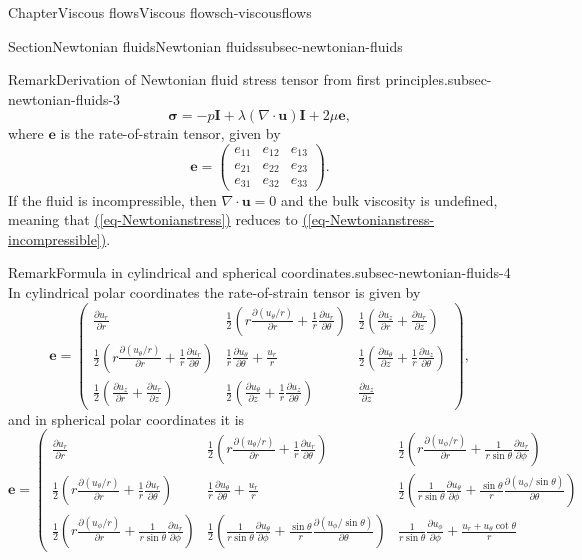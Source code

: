 \documentclass[oneside,10pt,]{book}
\newcommand{\xreffont}{\relax}
\numberwithin{equation}{section}
\newcommand{\pd}[2]{\frac{\partial#1}{\partial#2}}
\newcommand{\be}{\boldsymbol{e}}
\newcommand{\bu}{\boldsymbol{u}}
\newcommand{\bsigma}{\boldsymbol{\sigma}}
\newcommand{\bI}{\boldsymbol{I}}
\begin{document}
\begin{chapterptx}{Chapter}{Viscous flows}{}{Viscous flows}{}{}{ch-viscousflows}
\begin{sectionptx}{Section}{Newtonian fluids}{}{Newtonian fluids}{}{}{subsec-newtonian-fluids}
\begin{remark}{Remark}{Derivation of Newtonian fluid stress tensor from first principles.}{subsec-newtonian-fluids-3}
\begin{equation*}
\bsigma=-p\bI+\lambda\left(\nabla\cdot\bu\right)\bI+2\mu\be,
\end{equation*}
where \(\be\) is the rate-of-strain tensor, given by%
\begin{equation*}
\be=\left(\begin{matrix}
e_{11}&e_{12}&e_{13}\\
e_{21}&e_{22}&e_{23}\\
e_{31}&e_{32}&e_{33}
\end{matrix}\right).
\end{equation*}
If the fluid is incompressible, then \(\nabla\cdot\bu=0\) and the bulk viscosity is undefined, meaning that \hyperref[eq-Newtonianstress]{({\xreffont\ref{eq-Newtonianstress}})} reduces to \hyperref[eq-Newtonianstress-incompressible]{({\xreffont\ref{eq-Newtonianstress-incompressible}})}.%
\end{remark}
\begin{remark}{Remark}{Formula in cylindrical and spherical coordinates.}{subsec-newtonian-fluids-4}%
In cylindrical polar coordinates the rate-of-strain tensor is given by%
\begin{equation}
\be=\left(\begin{matrix}
\pd{u_r}{r}&\frac12\left(r\pd{(u_\theta/r)}{r}+\frac1r\pd{u_r}{\theta}\right)&\frac12\left(\pd{u_z}{r}+\pd{u_r}{z}\right)\\
\frac12\left(r\pd{(u_\theta/r)}{r}+\frac1r\pd{u_r}{\theta}\right)&\frac1r\pd{u_\theta}{\theta}+\frac{u_r}{r}&\frac12\left(\pd{u_\theta}{z}+\frac1r\pd{u_z}{\theta}\right)\\
\frac12\left(\pd{u_z}{r}+\pd{u_r}{z}\right)&\frac12\left(\pd{u_\theta}{z}+\frac1r\pd{u_z}{\theta}\right)&\pd{u_z}{z}
\end{matrix}\right),\label{eq-strainrate-cyl}
\end{equation}
and in spherical polar coordinates it is%
\begin{equation}
\be=\left(\begin{matrix}
\pd{u_r}{r}&\frac12\left(r\pd{(u_\theta/r)}{r}+\frac1r\pd{u_r}{\theta}\right)&\frac12\left(r\pd{(u_\phi/r)}{r}+\frac1{r\sin\theta}\pd{u_r}{\phi}\right)\\
\frac12\left(r\pd{(u_\theta/r)}{r}+\frac1r\pd{u_r}{\theta}\right)&\frac1r\pd{u_\theta}{\theta}+\frac{u_r}{r}&\frac12\left(\frac1{r\sin\theta}\pd{u_\theta}{\phi}+\frac{\sin\theta}{r}\pd{(u_\phi/\sin\theta)}{\theta}\right)\\
\frac12\left(r\pd{(u_\phi/r)}{r}+\frac1{r\sin\theta}\pd{u_r}{\phi}\right)&\frac12\left(\frac1{r\sin\theta}\pd{u_\theta}{\phi}+\frac{\sin\theta}r\pd{(u_\phi/\sin\theta)}{\theta}\right)&\frac1{r\sin\theta}\pd{u_\phi}{\phi}+\frac{u_r+u_\theta\cot\theta}{r}

\end{matrix}
\end{equation}
\end{remark}
\end{sectionptx}
\end{chapterptx}
\end{document}
